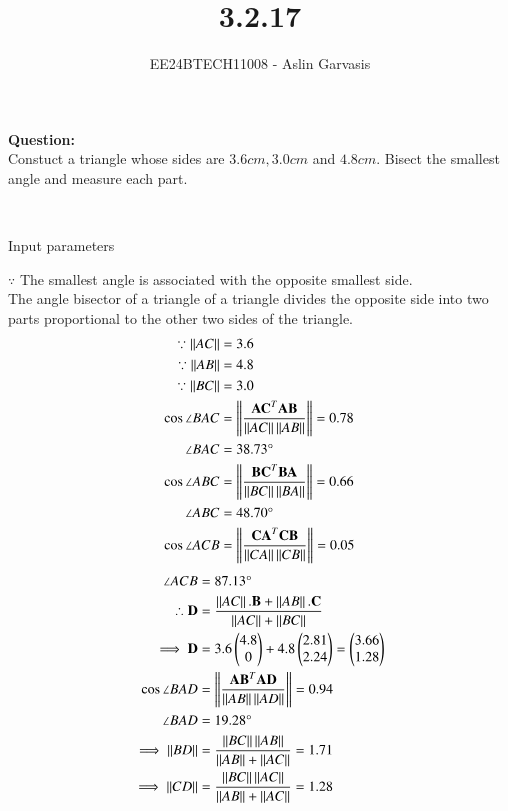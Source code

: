 \documentclass[journal]{IEEEtran}
\begin{document}

\vspace{3cm}
\title{3.2.17}
\author{EE24BTECH11008 - Aslin Garvasis
}
{\let\newpage\relax\maketitle}

\renewcommand{\thefigure}{\theenumi}
\renewcommand{\thetable}{\theenumi}
\setlength{\intextsep}{10pt} %
 \textbf{Question:}\\
 Constuct a triangle whose sides are $3.6cm, 3.0cm$ and $4.8cm.$ Bisect the smallest angle and measure each part.
 
 \solution \\ 
 \begin{table}[h!]    
  \centering
  
  \caption{Input parameters}
  \label{tab1.1.9.16}
\end{table}
$\because$ The smallest angle is associated with the opposite smallest side.\\
The angle bisector of a triangle of a triangle divides the opposite side into two parts proportional to the other two sides of the triangle.\\
\begin{align}
	\because \left\lVert AC\right\rVert&=3.6\\
	\because \left\lVert AB\right\rVert&=4.8\\
	\because \left\lVert BC\right\rVert&=3.0\\
	\cos{\angle BAC}&=\left\lVert\frac{\mathbf{AC}^T\mathbf{AB}}{\left\lVert AC\right\rVert\left\lVert AB\right\rVert}\right\rVert=0.78\\
	\angle{BAC}&=38.73\degree\\
	\cos{\angle ABC}&=\left\lVert\frac{\mathbf{BC}^T\mathbf{BA}}{\left\lVert BC\right\rVert\left\lVert BA\right\rVert}\right\rVert=0.66\\
	\angle{ABC}&=48.70\degree\\
	\cos{\angle ACB}&=\left\lVert\frac{\mathbf{CA}^T\mathbf{CB}}{\left\lVert CA\right\rVert\left\lVert CB\right\rVert}\right\rVert=0.05
\end{align}
\begin{align}
	\angle{ACB}&=87.13\degree\\
	\therefore \mathbf{D}&=\frac{\left\lVert AC\right\rVert.\mathbf{B}+\left\lVert AB\right\rVert.\mathbf{C}}{\left\lVert AC\right\rVert+\left\lVert BC\right\rVert}\\
	\implies \mathbf{D}&=3.6\begin{pmatrix}4.8\\0\end{pmatrix}+4.8\begin{pmatrix}2.81\\2.24\end{pmatrix}=\begin{pmatrix}3.66\\1.28\end{pmatrix}\\
	\cos{\angle BAD}&=\left\lVert\frac{\mathbf{AB}^T\mathbf{AD}}{\left\lVert AB\right\rVert\left\lVert AD\right\rVert}\right\rVert=0.94\\
	\angle{BAD}&=19.28\degree\\
	\implies \left\lVert BD\right\rVert&=\frac{\left\lVert BC\right\rVert\left\lVert AB\right\rVert}{\left\lVert AB\right\rVert+\left\lVert AC\right\rVert}=1.71\\
	\implies \left\lVert CD\right\rVert&=\frac{\left\lVert BC\right\rVert\left\lVert AC\right\rVert}{\left\lVert AB\right\rVert+\left\lVert AC\right\rVert}=1.28
 \end{align}
 \newpage
\end{document}
